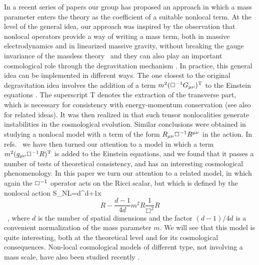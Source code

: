 \documentclass[aps,prd,twocolumn,superscriptaddress,nofootinbib]{revtex4}
\begin{document}
In a recent series of papers \cite{Jaccard:2013gla,Maggiore:2013mea,Foffa:2013vma,Foffa:2013sma,MMAK} our group has proposed an approach in which a mass parameter enters the theory as the coefficient of a suitable nonlocal term.  
At the level of the general idea,  our approach was inspired by the observation that nonlocal operators provide a way of writing  a mass term, both in massive electrodynamics and in linearized massive gravity, without breaking the gauge invariance of the massless 
theory~\cite{Dvali:2006su} and they can also play an important cosmological role through the degravitation mechanism  \cite{ArkaniHamed:2002fu}. In practice, this general idea can be implemented in different ways. The one closest to the original degravitation idea involves the addition of a term  $m^2(\Box^{-1}G_{\mu\nu})^{\rm T}$ to the Einstein equations
\cite{Jaccard:2013gla}. The  superscript T  denotes the extraction of the transverse part, which is necessary for consistency with energy-momentum conservation (see also
\cite{Porrati:2002cp} for related ideas). It was then realized in 
\cite{Maggiore:2013mea,Foffa:2013vma,Modesto:2013jea} that such tensor nonlocalities generate instabilities in the cosmological evolution. Similar conclusions were obtained in
\cite{Ferreira:2013tqn} studying a nonlocal model with a term of the form 
$R_{\mu\nu}\Box^{-1}R^{\mu\nu}$ in the action. In refs.~\cite{Maggiore:2013mea,Foffa:2013sma,Foffa:2013vma,MMAK} we have then turned our attention to a model in which a term $m^2(g_{\mu\nu}\Box^{-1} R)^ {\rm T} $ is added to the Einstein equations, and we found that it passes a number of tests of theoretical consistency, and  has an interesting cosmological phenomenology. In this paper we turn our attention to a related model, in which again the $\Box^{-1}$ operator acts on the Ricci scalar, but which is defined by the nonlocal action
\be\label{S1}
S_{\rm NL}=\int d^{d+1}x \, 
\[R-\frac{d-1}{4d} m^2R\frac{1}{\Box^2} R\]\, ,
\ee
where  $d$ is the number of spatial dimensions and the factor $(d-1)/4d$ is a convenient normalization of the mass parameter $m$. We will see that this model is quite interesting, both at the theoretical level and for its cosmological consequences.
Non-local cosmological models of different type, not involving a mass scale, have also been  studied recently \cite{Deser:2007jk,Nojiri:2007uq,Jhingan:2008ym,Koivisto:2008xfa,Koivisto:2008dh,Capozziello:2008gu,Elizalde:2011su,Zhang:2011uv,Elizalde:2012ja,Park:2012cp,Bamba:2012ky,Deser:2013uya,Ferreira:2013tqn,Dodelson:2013sma,Woodard:2014iga,Barvinsky:2003kg,Barvinsky:2011hd,Barvinsky:2011rk}. 
\end{document}
